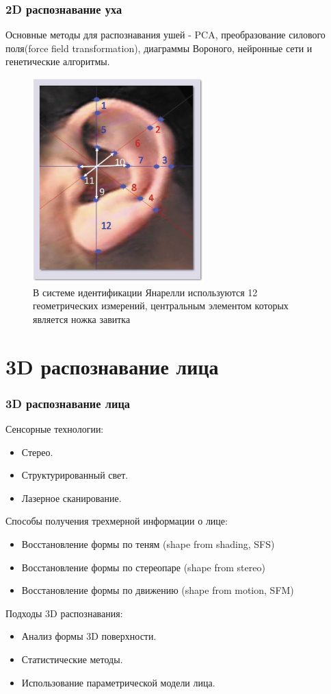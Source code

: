 \documentclass{beamer}
\begin{document}
\begin{frame}
\frametitle{2D распознавание уха}

Основные методы для распознавания ушей - PCA, преобразование силового поля(force field transformation), диаграммы Вороного, нейронные сети и генетические алгоритмы.

\begin{figure}[h!]
\centering
\includegraphics[scale=0.50]{res/twelve_parts}
\caption{В системе идентификации Янарелли используются 12 геометрических измерений, центральным элементом которых является ножка завитка}
\end{figure}

\end{frame}

\section{3D распознавание лица}

\begin{frame}
\frametitle{3D распознавание лица}

Сенсорные технологии:
\begin{itemize}
\item Стерео.
\item Структурированный свет.
\item Лазерное сканирование. 
\end{itemize}

Способы получения трехмерной информации о лице:
\begin{itemize}
\item Восстановление формы по теням (shape from shading, SFS)
\item Восстановление формы по стереопаре (shape from stereo)
\item Восстановление формы по движению (shape from motion, SFM)
\end{itemize}

Подходы 3D распознавания:
\begin{itemize}
\item Анализ формы 3D поверхности. 
\item Статистические методы.
\item Использование параметрической модели лица.
\end{itemize}

\end{frame}
\end{document}

